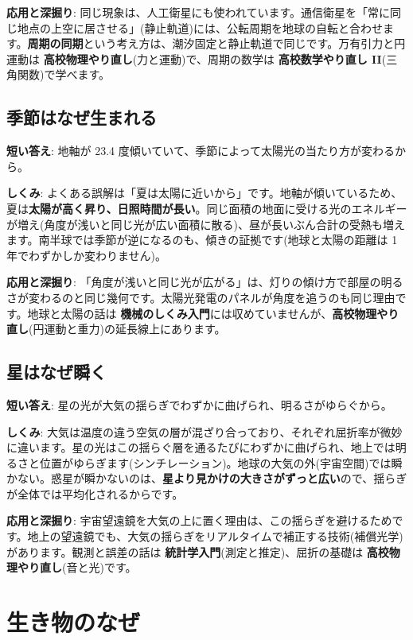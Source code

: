 \documentclass{article}
\begin{document}
\textbf{応用と深掘り}: 同じ現象は、人工衛星にも使われています。通信衛星を「常に同じ地点の上空に居させる」(静止軌道)には、公転周期を地球の自転と合わせます。\textbf{周期の同期}という考え方は、潮汐固定と静止軌道で同じです。万有引力と円運動は \textbf{高校物理やり直し}(力と運動)で、周期の数学は \textbf{高校数学やり直し II}(三角関数)で学べます。

\subsection{季節はなぜ生まれる}

\textbf{短い答え}: 地軸が 23.4 度傾いていて、季節によって太陽光の当たり方が変わるから。

\textbf{しくみ}: よくある誤解は「夏は太陽に近いから」です。地軸が傾いているため、夏は\textbf{太陽が高く昇り、日照時間が長い}。同じ面積の地面に受ける光のエネルギーが増え(角度が浅いと同じ光が広い面積に散る)、昼が長いぶん合計の受熱も増えます。南半球では季節が逆になるのも、傾きの証拠です(地球と太陽の距離は 1 年でわずかしか変わりません)。

\textbf{応用と深掘り}: 「角度が浅いと同じ光が広がる」は、灯りの傾け方で部屋の明るさが変わるのと同じ幾何です。太陽光発電のパネルが角度を追うのも同じ理由です。地球と太陽の話は \textbf{機械のしくみ入門}には収めていませんが、\textbf{高校物理やり直し}(円運動と重力)の延長線上にあります。

\subsection{星はなぜ瞬く}

\textbf{短い答え}: 星の光が大気の揺らぎでわずかに曲げられ、明るさがゆらぐから。

\textbf{しくみ}: 大気は温度の違う空気の層が混ざり合っており、それぞれ屈折率が微妙に違います。星の光はこの揺らぐ層を通るたびにわずかに曲げられ、地上では明るさと位置がゆらぎます(シンチレーション)。地球の大気の外(宇宙空間)では瞬かない。惑星が瞬かないのは、\textbf{星より見かけの大きさがずっと広い}ので、揺らぎが全体では平均化されるからです。

\textbf{応用と深掘り}: 宇宙望遠鏡を大気の上に置く理由は、この揺らぎを避けるためです。地上の望遠鏡でも、大気の揺らぎをリアルタイムで補正する技術(補償光学)があります。観測と誤差の話は \textbf{統計学入門}(測定と推定)、屈折の基礎は \textbf{高校物理やり直し}(音と光)です。

\section{生き物のなぜ}
\end{document}
